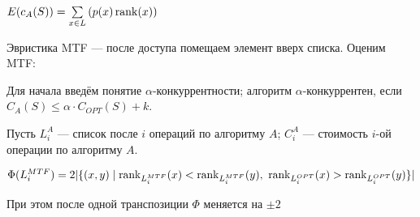 $E(c_A(S)) = \sum\limits_{x\in L}\left(p(x)\operatorname{rank}(x)\right)$

Эвристика MTF --- после доступа помещаем элемент вверх списка. Оценим MTF:

Для начала введём понятие $\alpha$-конкуррентности; алгоритм $\alpha$-конкуррентен, если $C_A(S) \leqslant \alpha\cdot C_{OPT}(S)+k$.

Пусть $L_i^A$ --- список после $i$ операций по алгоритму $A$; $C_i^A$ --- стоимость $i$-ой операции по алгоритму $A$.

$\Phi(L_i^{MTF}) = 2|\{(x, y)\mid\operatorname{rank}_{L_i^{MTF}}(x) < \operatorname{rank}_{L_i^{MTF}}(y),\ \operatorname{rank}_{L_i^{OPT}}(x) > \operatorname{rank}_{L_i^{OPT}}(y) \}|$

При этом после одной транспозиции $\Phi$ меняется на $\pm 2$

